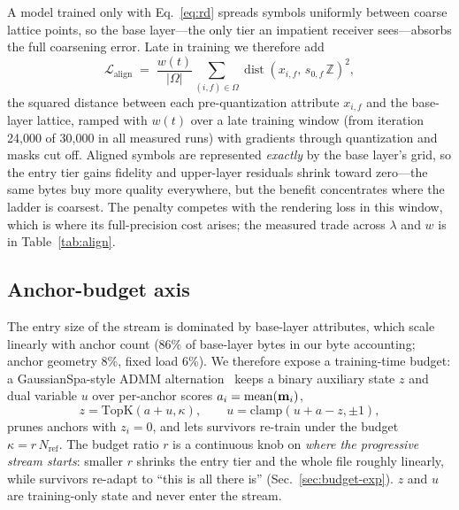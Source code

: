 A model trained only with Eq.~\eqref{eq:rd} spreads symbols uniformly between coarse lattice points, so the base layer---the only tier an impatient receiver sees---absorbs the full coarsening error.
Late in training we therefore add
\begin{equation}
\mathcal{L}_{\mathrm{align}} \;=\; \frac{w(t)}{|\Omega|} \sum_{(i,f)\in\Omega} \operatorname{dist}\!\left(x_{i,f},\, s_{0,f}\,\mathbb{Z}\right)^2,
\label{eq:align}
\end{equation}
the squared distance between each pre-quantization attribute $x_{i,f}$ and the base-layer lattice, ramped with $w(t)$ over a late training window (from iteration 24{,}000 of 30{,}000 in all measured runs) with gradients through quantization and masks cut off.
Aligned symbols are represented \emph{exactly} by the base layer's grid, so the entry tier gains fidelity and upper-layer residuals shrink toward zero---the same bytes buy more quality everywhere, but the benefit concentrates where the ladder is coarsest.
The penalty competes with the rendering loss in this window, which is where its full-precision cost arises; the measured trade across $\lambda$ and $w$ is in Table~\ref{tab:align}.

\subsection{Anchor-budget axis}
\label{sec:budget}

The entry size of the stream is dominated by base-layer attributes, which scale linearly with anchor count (86\% of base-layer bytes in our byte accounting; anchor geometry 8\%, fixed load 6\%).
We therefore expose a training-time budget: a GaussianSpa-style ADMM alternation~\cite{zhang2025gaussianspa} keeps a binary auxiliary state $z$ and dual variable $u$ over per-anchor scores $a_i = \mathrm{mean}(\mathbf{m}_i)$,
\begin{equation}
z = \mathrm{TopK}(a + u, \kappa), \qquad
u = \mathrm{clamp}(u + a - z, \pm 1),
\label{eq:admm}
\end{equation}
prunes anchors with $z_i{=}0$, and lets survivors re-train under the budget $\kappa = r\,N_{\mathrm{ref}}$.
The budget ratio $r$ is a continuous knob on \emph{where the progressive stream starts}: smaller $r$ shrinks the entry tier and the whole file roughly linearly, while survivors re-adapt to ``this is all there is'' (Sec.~\ref{sec:budget-exp}).
$z$ and $u$ are training-only state and never enter the stream.
